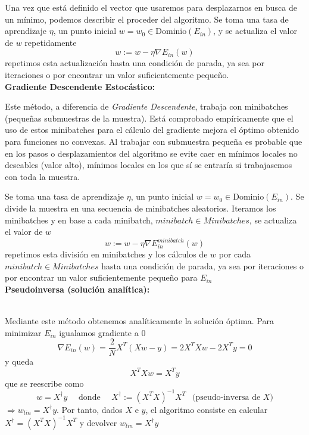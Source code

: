 \documentclass[11pt,a4paper]{article}
\theoremstyle{definition}
\begin{document}
	Una vez que está definido el vector que usaremos para desplazarnos en busca de un mínimo, podemos describir el proceder del algoritmo. Se toma una tasa de aprendizaje $\eta$, un punto inicial $w=w_0\in \text{Dominio}(E_{in})$, y se actualiza el valor de $w$ repetidamente
	$$w:=w-\eta \nabla E_{in}(w)$$
	repetimos esta actualización hasta una condición de parada, ya sea por iteraciones o por encontrar un valor suficientemente pequeño.\\
	
	\textbf{Gradiente Descendente Estocástico:}
	
	Este método, a diferencia de \textit{Gradiente Descendente}, trabaja con minibatches (pequeñas submuestras de la muestra). Está comprobado empíricamente que el uso de estos minibatches para el cálculo del gradiente mejora el óptimo obtenido para funciones no convexas. Al trabajar con submuestra pequeña es probable que en los pasos o desplazamientos del algoritmo se evite caer en mínimos locales no deseables (valor alto), mínimos locales en los que sí se entraría si trabajasemos con toda la muestra.

	Se toma una tasa de aprendizaje $\eta$, un punto inicial $w=w_0\in \text{Dominio}(E_{in})$. Se divide la muestra en una secuencia de minibatches aleatorios. Iteramos los minibatches y en base a cada minibatch, $minibatch \in Minibatches$, se actualiza el valor de $w$
	$$w:=w-\eta \nabla E_{in}^{minibatch}(w)$$
	repetimos esta división en minibatches y los cálculos de $w$ por cada $minibatch \in Minibatches$ hasta una condición de parada, ya sea por iteraciones o por encontrar un valor suficientemente pequeño para $E_{in}$\\
	
	\textbf{Pseudoinversa (solución analítica):} $\quad \quad \quad \quad \quad \quad \quad \quad \quad \quad \quad \quad \quad \quad \quad \quad \quad \quad \quad \quad \quad \quad \quad \quad \quad \quad \quad \quad  \quad $ %
	
    Mediante este método obtenemos analíticamente la solución óptima. Para minimizar $E_{in}$ igualamos gradiente a 0
	$$\nabla E_{in}(w)=\frac{2}{N} X^T (Xw-y)=2X^TXw-2X^Ty=0$$
	y queda
	$$X^TXw= X^Ty$$
	que se reescribe como
	$$w=X^\dagger y \quad \text{ donde } \quad X^\dagger :=(X^TX)^{-1}X^T \ \ \text{ (pseudo-inversa de } X\text{)}$$
	$\Rightarrow w_{lin}=X^\dagger y$.
	Por tanto, dados $X$ e $y$, el algoritmo consiste en calcular $X^\dagger =(X^TX)^{-1}X^T$ y devolver $w_{lin}=X^\dagger y$
	
\end{document}
